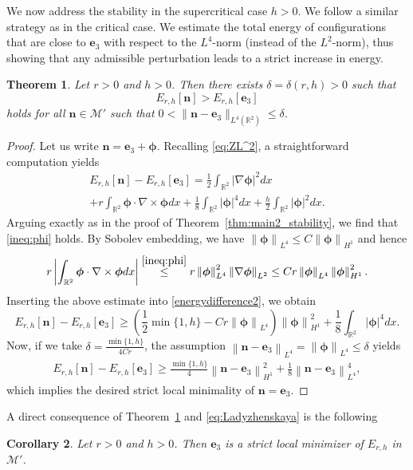 \documentclass{amsart}
\numberwithin{equation}{section}
\newtheorem{theorem}{Theorem}[section]
\newtheorem{corollary}[theorem]{Corollary}
\theoremstyle{definition}
\theoremstyle{remark}
\newcommand{\R}{\mathbb{R}}
\newcommand{\boM}{\mathcal{M}}
\newcommand{\nor}[2]{\left\| {#1} \right\|_{#2}}		%
\newcommand{\nab}{{\nabla}}							%
\newcommand{\bn}{{\mathbf{n}}}
\newcommand{\boe}{{\mathbf{e}}}
\newcommand{\bphi}{{\bm{\phi}}}
\begin{document}
We now address the stability in the supercritical case $h>0$. We follow a similar strategy as in the critical case. We estimate the total energy of configurations that are close to $\boe_3$ with respect to the $L^4$-norm (instead of the $L^2$-norm), thus showing that any admissible perturbation leads to a strict increase in energy.

\begin{theorem}\label{thm:h>0}
Let $r>0$ and $h>0$. Then there exists $\delta=\delta(r,h)>0$ such that
$$
E_{r,h}[\bn] > E_{r,h}[\boe_3]
$$
holds for all $\bn\in \boM'$ such that $0<\|\bn-\boe_3\|_{L^4(\R^2)}\leq \delta$.
\end{theorem}
\begin{proof}
Let us write $\bn = \boe_3 + \bphi$. Recalling \eqref{eq:ZL^2}, a straightforward computation yields
\begin{multline}\label{energydifference2}
E_{r,h} [\bn] - E_{r,h}[\boe_3] = 
\frac 12 \int_{\R^2} |\nab \bphi|^2 dx 
\\+ r\int_{\R^2} \bphi \cdot \nab \times \bphi dx 
+ \frac 18 \int_{\R^2} |\bphi|^4 dx 
+ \frac{h}2  \int_{\R^2} |\bphi|^2 dx.
\end{multline}
Arguing exactly as in the proof of Theorem~\ref{thm:main2_stability}, we find that \eqref{ineq:phi} holds. By Sobolev embedding, we have $\nor{\bphi}{L^4}\leq C\nor{\bphi}{H^1}$ and hence
$$
r \left| \int_{\R^2} \bphi \cdot \nab \times \bphi dx\right| 
\stackrel{\eqref{ineq:phi}}{\le} r \nor{\bphi}{L^4}^2 \nor{\nab \bphi}{L^2}\le  C r \nor{\bphi}{L^4}\nor{\bphi}{H^1}^2.
$$
Inserting the above estimate into \eqref{energydifference2}, we obtain 
$$
E_{r,h} [\bn] - E_{r,h}[\boe_3] \ge 
\left(\frac12\min\{1,h\} - Cr\nor{\bphi}{L^4} \right)
\nor{\bphi}{H^1}^2
+ \frac 18 \int_{\R^2} |\bphi|^4 dx.
$$
Now, if we take $\delta=\frac{\min\{1,h\}}{4Cr}$, the assumption $\nor{\bn-\boe_3}{L^4}=\nor{\bphi}{L^4}\leq\delta$ yields
\begin{align*}
	E_{r,h} [\bn] - E_{r,h}[\boe_3] \geq \frac{\min\{1,h\}}{4}\nor{\bn-\boe_3}{H^1}^2 + \frac{1}{8}\nor{\bn-\boe_3}{L^4}^4,
\end{align*}
which implies the desired strict local minimality of $\bn=\boe_3$.
\end{proof}

A direct consequence of Theorem~\ref{thm:h>0} and \eqref{eq:Ladyzhenskaya} is the following

\begin{corollary}\label{corollary:stabilityh>0}
Let $r>0$ and $h>0$. Then $\boe_3$ is a strict local minimizer of $E_{r,h}$ in $\boM'$.
\end{corollary}
\end{document}
